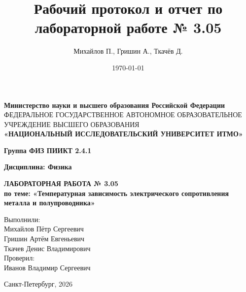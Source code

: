 \documentclass[12pt]{article}
\author{Михайлов П., Гришин А., Ткачёв Д.}
\title{Рабочий протокол и отчет по лабораторной работе № 3.05\\}
\date{\today}
\begin{document}
\begin{titlepage}
    \centering
    {\fontsize{11}{13}\selectfont \textbf{Министерство науки и высшего образования Российской Федерации}} \\
    {\fontsize{7}{10}\selectfont ФЕДЕРАЛЬНОЕ ГОСУДАРСТВЕННОЕ АВТОНОМНОЕ ОБРАЗОВАТЕЛЬНОЕ УЧРЕЖДЕНИЕ ВЫСШЕГО ОБРАЗОВАНИЯ} \\
    \vspace{0.2cm} 
    {\fontsize{14}{17}\selectfont \textbf{«НАЦИОНАЛЬНЫЙ ИССЛЕДОВАТЕЛЬСКИЙ УНИВЕРСИТЕТ ИТМО»}}
    
    \vspace{1cm} 
    
    {\fontsize{12}{14}\selectfont \textbf{Группа ФИЗ ПИИКТ 2.4.1}}
    
    \vspace{1cm}
    
    {\fontsize{12}{14}\selectfont \textbf{Дисциплина: Физика}}
    
    \vspace*{\fill}
    
    {\fontsize{18}{22}\selectfont \textbf{ЛАБОРАТОРНАЯ РАБОТА № 3.05}} \\
    \vspace{0.5cm}
    {\fontsize{14}{17}\selectfont \textbf{по теме: «Температурная зависимость электрического сопротивления металла и полупроводника»}}
    
    \vspace{3cm}
    
    \begin{flushright}
        \fontsize{12}{14}\selectfont
        Выполнили: \\
        Михайлов Пётр Сергеевич\\
        Гришин Артём Евгеньевич\\
        Ткачев Денис Владимирович\\
        \vspace{1em}
        Проверил: \\
        Иванов Владимир Сергеевич
    \end{flushright}
    
    \vfill
    
    {\fontsize{12}{14}\selectfont
    Санкт-Петербург, 2026
    }
\end{titlepage}
\end{document}
